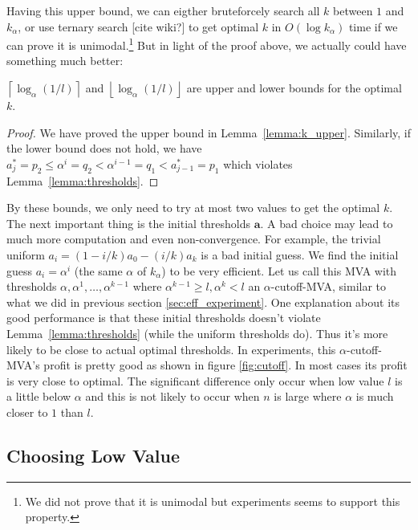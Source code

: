 Having this upper bound, we can eigther bruteforcely search all $k$ between $1$
and $k_\alpha$, or use ternary search [cite wiki?] to get optimal $k$ in
$O(\log k_\alpha)$ time if we can prove it is unimodal.\footnote{We did not
prove that it is unimodal but experiments seems to support this property.}
But in light of the proof above, we actually could have something much better:

\begin{theorem}\label{theorem:k_bounds}
$\left\lceil \log_{\alpha} \left(1/l\right) \right\rceil$ and 
$\left\lfloor \log_{\alpha} \left(1/l\right) \right\rfloor$ are upper
and lower bounds for the optimal $k$. 
\end{theorem}

\begin{proof}
We have proved the upper bound in Lemma~\ref{lemma:k_upper}. Similarly, if the lower bound
does not hold, we have $a^*_j = p_2 \leq \alpha^i = q_2 < \alpha^{i-1} =
q_1 < a^*_{j-1} = p_1$ which violates Lemma~\ref{lemma:thresholds}. 
\end{proof}

By these bounds, we only need to try at most two values to get the optimal $k$.
The next important thing is the initial thresholds $\boldsymbol a$. A bad
choice may lead to much more computation and even non-convergence. For example,
the trivial uniform $a_i = (1-i/k)a_0 - (i/k) a_k$ is a bad initial guess. We
find the initial guess $a_i = \alpha^i$ (the same $\alpha$ of $k_\alpha$) to be
very efficient.  Let us call this MVA with thresholds $\alpha, \alpha^1,
\ldots, \alpha^{k-1}$ where $\alpha^{k-1} \geq l, \alpha^k < l$ an
$\alpha$-cutoff-MVA, similar to what we did in previous section
\ref{sec:eff_experiment}.  One explanation about its good performance is that
these initial thresholds doesn't violate Lemma~\ref{lemma:thresholds} (while
the uniform thresholds do). Thus it's more likely to be close to actual optimal
thresholds.
In experiments, this $\alpha$-cutoff-MVA's profit is pretty good as shown
in figure \ref{fig:cutoff}. In most cases its profit is very close to optimal.
The significant difference only occur when low value $l$ is a little below
$\alpha$ and this is not likely to occur when $n$ is large where $\alpha$ is
much closer to $1$ than $l$.

\subsection{Choosing Low Value}


